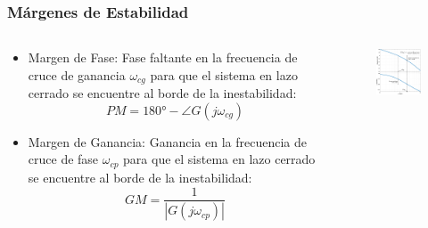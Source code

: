 \documentclass[aspectratio=169]{beamer}
\theoremstyle{definition}
\theoremstyle{plain}
\theoremstyle{remark}
\begin{document}
\begin{frame}[<+->]\frametitle{Márgenes de Estabilidad}
	\small
	\begin{columns}
		\begin{column}{0.45\textwidth}
			\begin{itemize}
				\item Margen de Fase: Fase faltante en la frecuencia de cruce de ganancia $\omega_{cg}$ para que el sistema en lazo cerrado se encuentre al borde de la inestabilidad:
				\begin{equation*}
					PM = \ang{180} - \angle G(j\omega_{cg})
				\end{equation*}
				\item Margen de Ganancia: Ganancia en la frecuencia de cruce de fase $\omega_{cp}$ para que el sistema en lazo cerrado se encuentre al borde de la inestabilidad:
				\begin{equation*}
					GM = \frac{1}{|G(j\omega_{cp})|}
				\end{equation*}
			\end{itemize}
		\end{column}
		\begin{column}{0.55\textwidth}
		\begin{figure}
			\vspace*{-4mm}
			\centering
			\includegraphics[width=7cm]{images/phaseGainMarginsExample.eps}
		\end{figure}
		\end{column}
	\end{columns}	
\end{frame}
\end{document}
